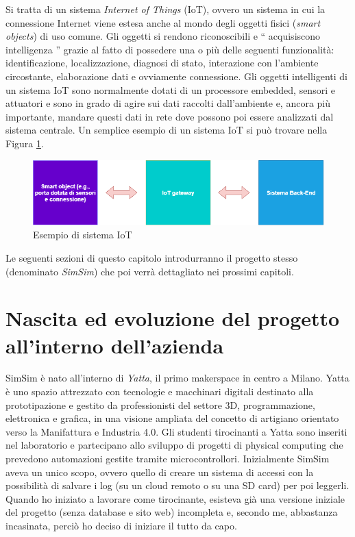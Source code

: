 \documentclass[12pt]{report}
\begin{document}
Si tratta di un sistema \emph{Internet of Things} (IoT), ovvero un sistema in cui la connessione Internet viene estesa anche al mondo degli oggetti fisici (\emph{smart objects}\cite{smart_objects}) di uso comune. Gli oggetti si rendono riconoscibili e \textquotedblleft{} acquisiscono intelligenza \textquotedblright{} grazie al fatto di possedere una o più delle seguenti funzionalità: identificazione, localizzazione, diagnosi di stato, interazione con l'ambiente circostante, elaborazione dati e ovviamente connessione.
Gli oggetti intelligenti di un sistema IoT sono normalmente dotati di un processore embedded, sensori e attuatori e sono in grado di agire sui dati raccolti dall'ambiente e, ancora più importante, mandare questi dati in rete dove possono poi essere analizzati dal sistema centrale\cite{IoT}. Un semplice esempio di un sistema IoT si può trovare nella Figura \ref{fig:iot_diagram}.

\begin{figure}[H]
	\includegraphics[width=\linewidth]{./img/iot_diagram.png}
	\caption{Esempio di sistema IoT}
	\label{fig:iot_diagram}
\end{figure}

Le seguenti sezioni di questo capitolo introdurranno il progetto stesso (denominato \emph{SimSim}) che poi verrà dettagliato nei prossimi capitoli.

%
\section{Nascita ed evoluzione del progetto all'interno dell'azienda}
%

SimSim è nato all'interno di \emph{Yatta}, il primo makerspace in centro a Milano. Yatta è uno spazio attrezzato con tecnologie e macchinari digitali destinato alla prototipazione e gestito da professionisti del settore 3D, programmazione, elettronica e grafica, in una visione ampliata del concetto di artigiano orientato verso la Manifattura e Industria 4.0. Gli studenti tirocinanti a Yatta sono inseriti nel laboratorio e partecipano allo sviluppo di progetti di physical computing che prevedono automazioni gestite tramite microcontrollori. Inizialmente SimSim aveva un unico scopo, ovvero quello di creare un sistema di accessi con la possibilità di salvare i log (su un cloud remoto o su una SD card) per poi leggerli. Quando ho iniziato a lavorare come tirocinante, esisteva già una versione iniziale del progetto (senza database e sito web) incompleta e, secondo me, abbastanza incasinata, perciò ho deciso di iniziare il tutto da capo. 
\end{document}
